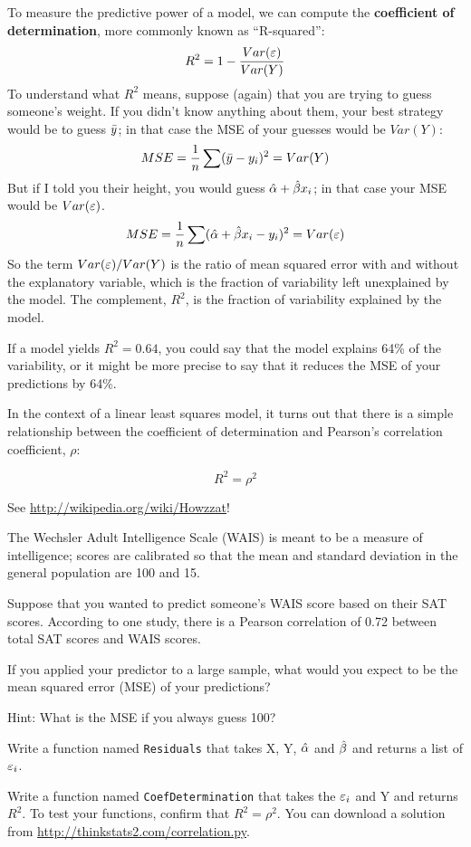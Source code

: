 \documentclass[12pt]{book}
\begin{document}
To measure the predictive power of a model, we can compute the {\bf
  coefficient of determination}, more commonly known as ``R-squared'':
%
\[ R^2 = 1 - \frac{Var(\varepsilon)}{Var(Y)}\]
%
To understand what $R^{2}$ means, suppose (again) that you are trying
to guess someone's weight.  If you didn't know anything about them,
your best strategy would be to guess $\bar{y}$; in
that case the MSE of your guesses would be $Var(Y)$:
%
\[ MSE = \frac{1}{n} \sum (\bar{y} - y_i)^2 = Var(Y) \]
%
But if I told you their height, you would guess $\hat{\alpha} +
\hat{\beta} x_i$; in that case your MSE would be $Var(\varepsilon)$.
%
\[ MSE = 
\frac{1}{n} \sum (\hat{\alpha} + \hat{\beta} x_i - y_i)^2 =
Var(\varepsilon) \]
%
So the term $Var(\varepsilon)/Var(Y)$ is the ratio of mean squared error with
and without the explanatory variable, which is the fraction of
variability left unexplained by the model.  The complement, $R^{2}$,
is the fraction of variability explained by the model.

If a model yields $R^{2} = 0.64$, you could say that the model explains
64\% of the variability, or it might be more precise to say that it
reduces the MSE of your predictions by 64\%.

In the context of a linear least squares model, it turns out that
there is a simple relationship between the coefficient of
determination and Pearson's correlation coefficient, $\rho$:

\[ R^{2} = \rho^{2}\]

See \url{http://wikipedia.org/wiki/Howzzat}!

\begin{exercise}
The Wechsler Adult Intelligence Scale (WAIS) is meant to be a measure
of intelligence; scores are calibrated so that the mean and standard
deviation in the general population are 100 and 15.

Suppose that you wanted to predict someone's WAIS score based on their
SAT scores.  According to one study, there is a Pearson correlation of
0.72 between total SAT scores and WAIS scores.

If you applied your predictor to a large sample, what would you expect to
be the mean squared error (MSE) of your predictions?

Hint: What is the MSE if you always guess 100?
\end{exercise}


\begin{exercise}
Write a function named {\tt Residuals} that takes X, Y, $\hat{\alpha}$
and $\hat{\beta}$ and returns a list of $\varepsilon_i$.

Write a function named {\tt CoefDetermination} that takes the 
$\varepsilon_i$ and Y and returns $R^{2}$.  To test your functions, 
confirm that $R^{2} = \rho^{2}$.  You can download a solution
from \url{http://thinkstats2.com/correlation.py}.

\end{exercise}
\end{document}
